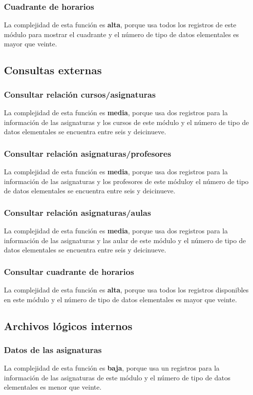 \documentclass[11pt,a4paper,spanish,twoside]{book}
\begin{document}
\subsubsection{Cuadrante de horarios}
La complejidad de esta función es \textbf{alta}, porque usa todos los
registros de este módulo para mostrar el cuadrante y el número de
tipo de datos elementales es mayor que veinte.

\subsection{Consultas externas}
\subsubsection{Consultar relación cursos/asignaturas}
La complejidad de esta función es \textbf{media}, porque usa dos
registros para la información de las asignaturas y los cursos de este
módulo y el número de tipo de datos elementales se encuentra entre seis y
deicinueve.
\subsubsection{Consultar relación asignaturas/profesores}
La complejidad de esta función es \textbf{media}, porque usa dos
registros para la información de las asignaturas y los profesores de este
móduloy el número de tipo de datos elementales se encuentra entre seis y
deicinueve.
\subsubsection{Consultar relación asignaturas/aulas}
La complejidad de esta función es \textbf{media}, porque usa dos
registros para la información de las asignaturas y las aular de este
módulo y el número de tipo de datos elementales se encuentra entre seis y
deicinueve.
\subsubsection{Consultar cuadrante de horarios}
La complejidad de esta función es \textbf{alta}, porque usa todos los
registros disponibles en este módulo y el número de tipo de datos elementales
es mayor que veinte.

\subsection{Archivos lógicos internos}
\subsubsection{Datos de las asignaturas}
La complejidad de esta función es \textbf{baja}, porque usa un
registros para la información de las asignaturas de este módulo y el número
de tipo de datos elementales es menor que veinte.
\end{document}
